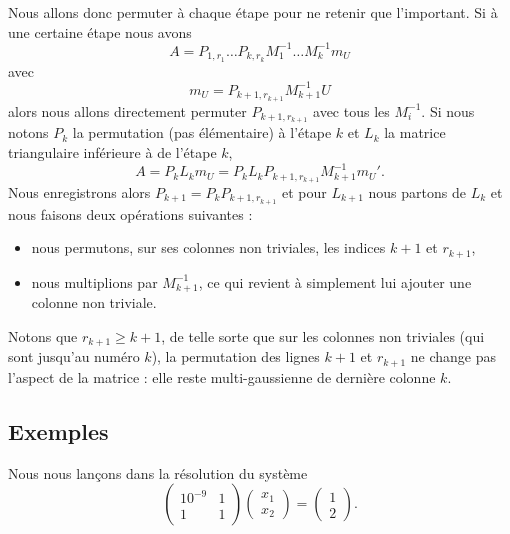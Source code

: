 Nous allons donc permuter à chaque étape pour ne retenir que l'important. Si à une certaine étape nous avons
\begin{equation}
    A=P_{1,r_1}\ldots P_{k,r_k}M_1^{-1}\ldots M_k^{-1} m_U
\end{equation}
avec
\begin{equation}
    m_U=P_{k+1,r_{k+1}}M_{k+1}^{-1}U
\end{equation}
alors nous allons directement permuter \( P_{k+1,r_{k+1}}\) avec tous les \( M_i^{-1}\). Si nous notons \( P_k\) la permutation (pas élémentaire) à l'étape \( k\) et \( L_k\) la matrice triangulaire inférieure à de l'étape \( k\),
\begin{equation}
    A=P_kL_km_U=P_kL_kP_{k+1,r_{k+1}}M_{k+1}^{-1}m_U'.
\end{equation}
Nous enregistrons alors \( P_{k+1}=P_kP_{k+1,r_{k+1}}\) et pour \( L_{k+1}\) nous partons de \( L_k\) et nous faisons deux opérations suivantes :
\begin{itemize}
    \item nous permutons, sur ses colonnes non triviales, les indices \( k+1\) et \( r_{k+1}\),
    \item nous multiplions par \( M_{k+1}^{-1}\), ce qui revient à simplement lui ajouter une colonne non triviale.
\end{itemize}
Notons que \( r_{k+1}\geq k+1\), de telle sorte que sur les colonnes non triviales (qui sont jusqu'au numéro \( k\)), la permutation des lignes \( k+1\) et \( r_{k+1}\) ne change pas l'aspect de la matrice : elle reste multi-gaussienne de dernière colonne \( k\).

\subsection{Exemples}

Nous nous lançons dans la résolution du système
\begin{equation}
    \begin{pmatrix}
        10^{-9}    &   1    \\
        1    &   1
    \end{pmatrix}\begin{pmatrix}
        x_1    \\
        x_2
    \end{pmatrix}=\begin{pmatrix}
        1    \\
        2
    \end{pmatrix}.
\end{equation}

